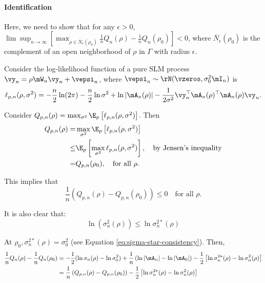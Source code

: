 \documentclass[english,12pt]{book}\usepackage[]{graphicx}\usepackage[]{xcolor}
\begin{document}
\begin{subappendices}
\paragraph{Identification}

Here, we need to show that for any $\epsilon>0$, $\lim\sup_{n \to \infty}\left[\max_{\rho\in\bar{N}_{\epsilon}(\rho_0)}\frac{1}{n}Q_n(\rho) - \frac{1}{n}Q_n(\rho_0)\right]<0$, where $\bar{N}_{\epsilon}(\rho_0)$ is the complement of an open neighborhood of $\rho$ in $\Gamma$ with radius $\epsilon$.

Consider the log-likelihood function of a pure SLM process $\vy_n = \rho\mW_n\vy_n + \vepsi_n$, where $\vepsi_n \sim \rN(\vzeros, \sigma_0^2\mI_n)$ is
\begin{equation*}
\ell_{p, n}(\rho, \sigma^2)= -\frac{n}{2}\ln(2\pi) - \frac{n}{2}\ln\sigma^2 + \ln\left|\mA_n(\rho)\right|-\frac{1}{2\sigma^2}\vy_n^\top\mA_n(\rho)^\top\mA_n(\rho)\vy_n.
\end{equation*}

Consider $Q_{p,n}(\rho) = \max_{\sigma^2}\E_p\left[\ell_{p, n}(\rho, \sigma^2)\right]$. Then
\begin{equation*}
\begin{aligned}
  Q_{p,n}(\rho)  = &\max_{\sigma^2} \E_p\left[\ell_{p, n}(\rho, \sigma^2)\right] \\
                 \leq & \E_p\left[\max_{\sigma^2}\ell_{p, n}(\rho, \sigma^2)\right],\quad \mbox{by Jensen's inequality} \\
                  = & Q_{p, n}(\rho_0), \quad \mbox{for all $\rho$}. 
\end{aligned}
\end{equation*}

This implies that 
\begin{equation*}
  \frac{1}{n}\left(Q_{p,n}(\rho) - Q_{p, n}(\rho_0)\right)\leq 0 \quad \mbox{for all $\rho$}. 
\end{equation*}

It is also clear that:
\begin{equation}
\ln(\sigma_n^2(\rho)) \leq \ln\sigma_n^{2*}(\rho)
\end{equation}

At $\rho_0, \sigma^{2*}_n(\rho) = \sigma_0^2$ (see Equation \eqref{eq:sigma-star-consistency}). Then, 
\begin{equation*}
\begin{aligned}
\frac{1}{n}Q_n(\rho) - \frac{1}{n}Q_n(\rho_0) & = -\frac{1}{2}(\ln \sigma_n(\rho) - \ln \sigma_0^2) + \frac{1}{n}\left(\ln \left|\mA_n\right| - \ln \left|\mA_0\right|\right)- \frac{1}{2}\left[\ln \sigma_n^{2*}(\rho) - \ln \sigma_n^2(\rho)\right] \\
& = \frac{1}{n}\left(Q_{p,n}(\rho) - Q_{p, n}(\rho_0)\right)- \frac{1}{2}\left[\ln \sigma_n^{2*}(\rho) - \ln \sigma_n^2(\rho)\right] 
\end{aligned}
\end{equation*}


\end{subappendices}
\end{document}
